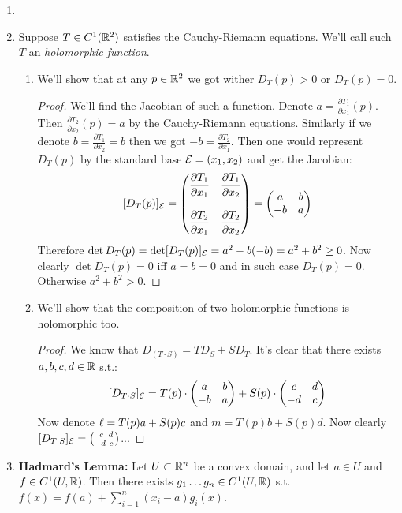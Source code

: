 \documentclass[a4paper]{article}
\newcommand\ial   {\partial}
\begin{document}
	\section{}
	\begin{enumerate}
		\item 
		\item Suppose $T \in C^{1}(\mathbb{R}^{2})$ satisfies the Cauchy-Riemann equations. We'll call such $T$ an \textit{holomorphic function}. 
		\begin{enumerate}
			\item We'll show that at any $p \in \mathbb{R}^{2}$ we got wither $D_T(p) > 0$ or $D_T(p) = 0$. \begin{proof}
				We'll find the Jacobian of such a function. Denote $a = \frac{\partial T_1}{\partial x_1}(p)$. Then $\frac{\partial T_2}{\partial x_2}(p) = a$ by the Cauchy-Riemann equations. Similarly if we denote $b = \frac{\partial T_1}{\partial x_2} = b$ then we got $-b = \frac{\partial T_2}{\partial x_1}$. Then one would represent $D_T(p)$ by the standard base $\mathcal{E} = (x_1, x_2)$ and get the Jacobian: 
				\[ [D_T(p)]_\ec = \pms{\disty \frac{\ial T_1}{\ial x_1} & \disty \frac{\ial T_1}{\ial x_2} \\ \ & \  \\
				\disty \frac{\ial T_2}{\ial x_1} & \disty \frac{\ial T_2}{\ial x_2}} = \pms{a & b \\ -b & a} \]
				Therefore $\det D_T(p) =\det [D_T(p)]_{\mathcal{E}} = a^{2} - b(-b) = a^{2} + b^{2} \ge 0$. Now clearly $\det D_T(p) = 0 $ iff $a = b = 0$ and in such case $D_T(p) = 0$. Otherwise $a^{2} + b^{2} > 0$. 
			\end{proof}
			\item We'll show that the composition of two holomorphic functions is holomorphic too. \begin{proof}
				We know that $D_(T \cdot S) = T D_S + S D_T$. It's clear that there exists $a, b, c, d \in \mathbb{R}$ s.t.:
				\[ [D_{T \cdot S}]_{\mathcal{E}}= T(p) \cdot \begin{pmatrix} a & b \\ -b & a \end{pmatrix} + S(p) \cdot \begin{pmatrix} c & d \\ -d & c \end{pmatrix} \]
				Now denote $\ell = T(p)a + S(p)c$ and $m = T(p)b + S(p)d$. Now clearly $[D_{T \cdot S}]_{\mathcal{E}} = \binom{\ \, c \, \ d\,}{-d \ c\,}$...
			\end{proof}
		\end{enumerate}
		\item \textbf{Hadmard's Lemma: }Let $U \subset \mathbb{R}^{n}$ be a convex domain, and let $a \in U$ and $f \in C^{1}(U, \mathbb{R})$. Then there exists $g_1 \dots g_n \in C^1(U, \mathbb{R})$ s.t. $f(x) = f(a) + \sum_{i = 1}^{n}(x_i - a)g_i(x)$. 

\end{enumerate}
\end{document}

